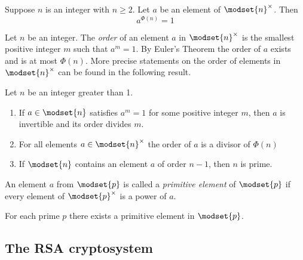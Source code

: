 \begin{theorem}
    Suppose $n$ is an integer with $n \ge 2$. Let $a$ be an element of
    $ \modset{n}^\times $. Then $$ a^{\Phi(n)} = 1 $$
\end{theorem}

Let $n$ be an integer. The \emph{order} of an element $a$ in $\modset{n}^\times$
is the smallest positive integer $m$ such that $a^m = 1$. By Euler's Theorem
the order of $a$ exists and is at most $ \Phi(n) $. More precise statements
on the order of elements in $ \modset{n}^\times $ can be found in the
following result.

\begin{theorem}[Orders]
    Let $n$ be an integer greater than 1.
    \begin{enumerate}
        \item If $a \in \modset{n}$ satisfies $a^m=1$ for some positive integer
        $m$, then $a$ is invertible and its order divides $m$.

        \item For all elements $a \in \modset{n}^\times$ the order of $a$ is
        a divisor of $ \Phi(n) $

        \item If $ \modset{n} $ contains an element $a$ of order $n-1$, then
        $n$ is prime.
    \end{enumerate}
\end{theorem}

\begin{definition}
    An element $a$ from $ \modset{p} $ is called a \emph{primitive element}
    of $ \modset{p} $ if every element of $ \modset{p}^\times $ is a power
    of $a$.
\end{definition}

\begin{theorem}
    For each prime $p$ there exists a primitive element in $ \modset{p} $.
\end{theorem}

\subsection{The RSA cryptosystem}
